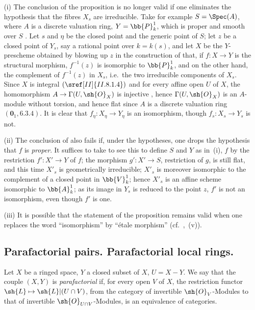 \begin{remark}[21.12.17]
\label{IV.21.12.17}
(i) The conclusion of the proposition  is no longer valid if one eliminates the hypothesis that the fibres $X_s$ are irreducible.
Take for example $S=\Spec(A)$, where $A$ is a discrete valuation ring, $Y=\bb{P}_k^1$, which is proper and smooth over $S$ .
Let $s$ and $\eta$ be the closed point and the generic point of $S$; let $z$ be a closed point of $Y_s$, say a rational point over $k=k(s)$, and let $X$ be the $Y$-prescheme obtained by blowing up $z$ in the construction of  that, if $f:X\to Y$ is the structural morphism, $f^{-1}(z)$ is isomorphic to $\bb{P}_k^1$, and on the other hand, the complement of $f^{-1}(z)$ in $X_s$, i.e.\ the two irreducible components of $X_s$.
Since $X$ is integral $(\sref[II]{II.8.1.4})$ and for every affine open $U$ of $X$, the homomorphism $A\to\Gamma(U,\sh{O}_X)$ is injective , hence $\Gamma(U,\sh{O}_X)$ is an $A$-module without torsion, and hence flat since $A$ is a discrete valuation ring $(\mathbf{0}_1, 6.3.4)$.
It is clear that $f_\eta:X_\eta\to Y_\eta$ is an isomorphism, though $f_s:X_s\to Y_s$ is not.

(ii) The conclusion of  also fails if, under the hypotheses, one drops the hypothesis that $f$ is \emph{proper}.
It suffices to take to see this to define $S$ and $Y$ as in~(i), $f$ by the restriction $f':X'\to Y$ of $f$; the morphism $g':X'\to S$, restriction of $g$, is still flat, and this time $X'_s$ is geometrically irreducible; $X'_s$ is moreover isomorphic to the complement of a closed point in $\bb{V}_k^1$; hence $X'_s$ is an affine scheme isomorphic to $\bb{A}_k^1$; as its image in $Y_s$ is reduced to the point $z$, $f'$ is not an isomorphism, even though $f'$ is one.

(iii) It is possible that the statement of the proposition  remains valid when one replaces the word ``isomorphism'' by ``étale morphism'' (cf.\ ,~(v)).
\end{remark}

\subsection{Parafactorial pairs. Parafactorial local rings.}
\label{subsection:IV.21.13}

\begin{definition}[21.13.1]
\label{IV.21.13.1}
Let $X$ be a ringed space, $Y$ a closed subset of $X$, $U=X-Y$.
We say that the couple $(X,Y)$ is \emph{parafactorial} if, for every open $V$ of $X$, the restriction functor $\sh{L}\mapsto\sh{L}|(U\cap V)$, from the category of invertible $\sh{O}_V$-Modules to that of invertible $\sh{O}_{U\cap V}$-Modules, is an equivalence of categories.
\end{definition}

